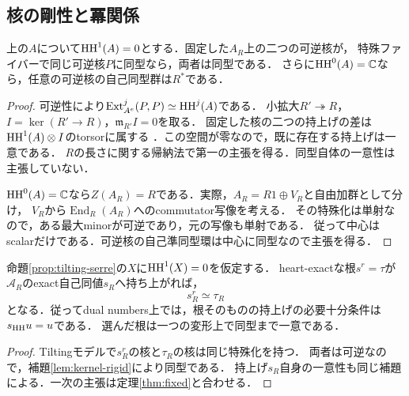 \subsection{核の剛性と冪関係}
\begin{lemma}[同一変形上の可逆核の一意性]\label{lem:kernel-rigid}
上の$A$について$\operatorname{HH}^1(A)=0$とする．固定した$A_R$上の二つの可逆核が，
特殊ファイバーで同じ可逆核$P$に同型なら，両者は同型である．
さらに$\operatorname{HH}^0(A)=\mathbb C$なら，任意の可逆核の自己同型群は$R^*$である．
\end{lemma}
\begin{proof}
可逆性により$\operatorname{Ext}_{A^e}^j(P,P)\simeq\operatorname{HH}^j(A)$である．
小拡大$R'\twoheadrightarrow R$，$I=\ker(R'\to R)$，$\mathfrak m_{R'}I=0$を取る．
固定した核の二つの持上げの差は$\operatorname{HH}^1(A)\otimes I$のtorsorに属する
\cite[Theorem B]{LowenOb}．この空間が零なので，既に存在する持上げは一意である．
$R$の長さに関する帰納法で第一の主張を得る．同型自体の一意性は主張していない．

$\operatorname{HH}^0(A)=\mathbb C$なら$Z(A_R)=R$である．実際，$A_R=R1\oplus V_R$と自由加群として分け，
$V_R$から$\operatorname{End}_R(A_R)$へのcommutator写像を考える．
その特殊化は単射なので，ある最大minorが可逆であり，元の写像も単射である．
従って中心はscalarだけである．可逆核の自己準同型環は中心に同型なので主張を得る．
\end{proof}

\begin{theorem}[関手の持上げは根の持上げになる]\label{thm:artin-power}
命題\ref{prop:tilting-serre}の$X$に$\operatorname{HH}^1(X)=0$を仮定する．
heart-exactな根$s^r=\tau$が$\mathcal A_R$のexact自己同値$s_R$へ持ち上がれば，
\[
 s_R^r\simeq\tau_R
\]
となる．従ってdual numbers上では，根そのものの持上げの必要十分条件は$s_{\operatorname{HH}}u=u$である．
選んだ根は一つの変形上で同型まで一意である．
\end{theorem}
\begin{proof}
Tiltingモデルで$s_R^r$の核と$\tau_R$の核は同じ特殊化を持つ．
両者は可逆なので，補題\ref{lem:kernel-rigid}により同型である．
持上げ$s_R$自身の一意性も同じ補題による．一次の主張は定理\ref{thm:fixed}と合わせる．
\end{proof}

